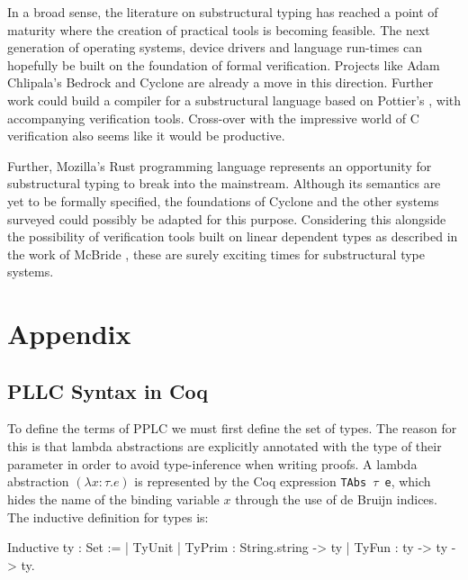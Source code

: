 \documentclass[]{unswthesis}
\newcommand{\SSPHS}{\text{SSPHS }}
\let\c\texttt
\begin{document}
In a broad sense, the literature on substructural typing has reached a point of maturity where the creation of practical tools is becoming feasible. The next generation of operating systems, device drivers and language run-times can hopefully be built on the foundation of formal verification. Projects like Adam Chlipala's Bedrock \cite{chlipala11} and Cyclone \cite{grossman05} are already a move in this direction. Further work could build a compiler for a substructural language based on Pottier's \SSPHS \cite{pottier13}, with accompanying verification tools. Cross-over with the impressive world of C verification also seems like it would be productive.

Further, Mozilla's Rust programming language represents an opportunity for substructural typing to break into the mainstream. Although its semantics are yet to be formally specified, the foundations of Cyclone and the other systems surveyed could possibly be adapted for this purpose. Considering this alongside the possibility of verification tools built on linear dependent types as described in the work of McBride \cite{mcbride16}, these are surely exciting times for substructural type systems.

\backmatter
\pagebreak



\chapter{Appendix}

\section{PLLC Syntax in Coq}
\label{app:pllc-syntax}

To define the terms of PPLC we must first define the set of types. The reason for this is that lambda abstractions are explicitly annotated with the type of their parameter in order to avoid type-inference when writing proofs. A lambda abstraction $(\lambda x : \tau. e)$ is represented by the Coq expression \c{TAbs $\tau$ e}, which hides the name of the binding variable $x$ through the use of de Bruijn indices. The inductive definition for types is:

\begin{coqcode}
Inductive ty : Set :=
  | TyUnit
  | TyPrim : String.string -> ty
  | TyFun : ty -> ty -> ty.
\end{coqcode}
\end{document}
